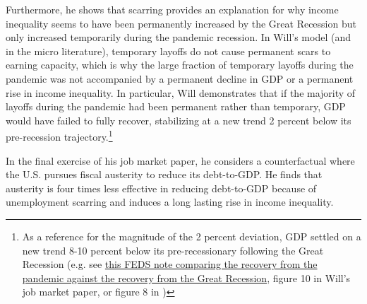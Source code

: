 \documentclass[\econtexRoot/Letter]{subfiles}
\begin{document}
Furthermore, he shows that scarring provides an explanation for why income inequality seems to have been permanently increased by the Great Recession but only increased temporarily during the pandemic recession. In Will's model (and in the micro literature), temporary layoffs do not cause permanent scars to earning capacity, which is why the large fraction of temporary layoffs during the pandemic was not accompanied by a permanent decline in GDP or a permanent rise in income inequality. In particular, Will demonstrates that if the majority of layoffs during the pandemic had been permanent rather than temporary, GDP would have failed to fully recover, stabilizing at a new trend 2 percent below its pre-recession trajectory.\footnote{As a reference for the magnitude of the 2 percent deviation, GDP settled on a new trend 8-10 percent below its pre-recessionary following the Great Recession (e.g. see \href{https://www.federalreserve.gov/econres/notes/feds-notes/why-is-the-u-s-gdp-recovering-faster-than-other-advanced-economies-20240517.html}{this FEDS note comparing the recovery from the pandemic against the recovery from the Great Recession}, figure 10 in Will's job market paper, or figure 8 in \cite{Christiano2015})}


In the final exercise of his job market paper, he considers a counterfactual where the U.S. pursues fiscal austerity to reduce its debt-to-GDP. He finds that austerity is four times less effective in reducing debt-to-GDP because of unemployment scarring and induces a long lasting rise in income inequality.
\end{document}
